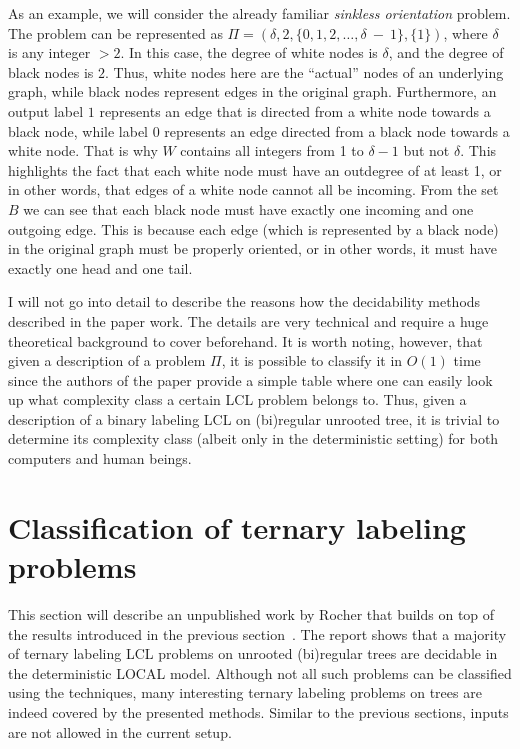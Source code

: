 As an example, we will consider the already familiar \emph{sinkless orientation}
problem. The problem can be represented as $\Pi = (\delta, 2, \{0, 1, 2, \dots, \delta~-~1\}, \{ 1 \})$,
where $\delta$ is any integer $> 2$. In this case, the degree of white nodes is
$\delta$, and the degree of black nodes is $2$. Thus, white nodes here are the ``actual''
nodes of an underlying graph, while black nodes represent edges in the original graph.
Furthermore, an output label $1$ represents an edge
that is directed from a white node towards a black node, while label $0$ represents
an edge directed from a black node towards a white node. That is why
$W$ contains all integers from 1 to $\delta - 1$ but not $\delta$.
This highlights the fact that each white node must have an outdegree of at least 1,
or in other words, that edges of a white node cannot all be incoming.
From the set $B$ we can see that each black node must have 
exactly one incoming and one outgoing edge. This is because each edge (which is represented by a black node)
in the original graph must be properly oriented, or in other words, it must
have exactly one head and one tail.

I will not go into detail to describe the reasons how the decidability methods
described in the paper work. The details are very technical and require a huge
theoretical background to cover beforehand. It is worth noting, however, that
given a description of a problem $\Pi$, it is possible to classify it in $O(1)$
time since the authors of the paper provide a simple table where one can
easily look up what complexity class a certain LCL problem belongs to. Thus,
given a description of a binary labeling LCL on (bi)regular unrooted tree,
it is trivial to determine its complexity class (albeit only in the deterministic setting)
for both computers and human beings.

\section{Classification of ternary labeling problems}

This section will describe an unpublished work by Rocher that builds on top
of the results introduced in the previous section~\cite{Rocher2020doc, Rocher2020clas}.
The report shows that a majority of ternary labeling LCL problems on unrooted
(bi)regular trees are decidable in the deterministic LOCAL model. Although not all such problems
can be classified using the techniques, many interesting ternary labeling problems on trees
are indeed covered by the presented methods.
Similar to the previous sections, inputs are not allowed in the current setup.

